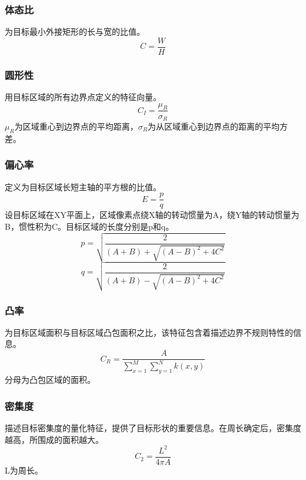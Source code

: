 \subsubsection{体态比}
为目标最小外接矩形的长与宽的比值。
    \begin{displaymath}
    C=\frac{W}{H}
    \end{displaymath}
    
\subsubsection{圆形性}
用目标区域的所有边界点定义的特征向量。
    \begin{displaymath}
    C_{I}=\frac{\mu_{R}}{\sigma_{R}}
    \end{displaymath}
    $\mu_{R}$为区域重心到边界点的平均距离，$\sigma_{R}$为从区域重心到边界点的距离的平均方差。

\subsubsection{偏心率}
定义为目标区域长短主轴的平方根的比值。
    \begin{displaymath}
    E=\frac{p}{q}
    \end{displaymath}
    设目标区域在XY平面上，区域像素点绕X轴的转动惯量为A，绕Y轴的转动惯量为B，惯性积为C。目标区域的长度分别是p和q。
    \begin{displaymath}
    p=\sqrt{\frac{2}{(A+B)+\sqrt{(A-B)^{2}+4C^{2}}}}
    \end{displaymath}
    \begin{displaymath}
    q=\sqrt{\frac{2}{(A+B)-\sqrt{(A-B)^{2}+4C^{2}}}}
    \end{displaymath}
    
\subsubsection{凸率}
为目标区域面积与目标区域凸包面积之比，该特征包含着描述边界不规则特性的信息。
    \begin{displaymath}
    C_{R}=\frac{A}{\sum_{x=1}^{M}\sum_{y=1}^{N}k(x,y)}
    \end{displaymath}
    分母为凸包区域的面积。
    
\subsubsection{密集度}
描述目标密集度的量化特征，提供了目标形状的重要信息。在周长确定后，密集度越高，所围成的面积越大。
    \begin{displaymath}
    C_{2}=\frac{L^{2}}{4\pi A}
    \end{displaymath}
    L为周长。
    
